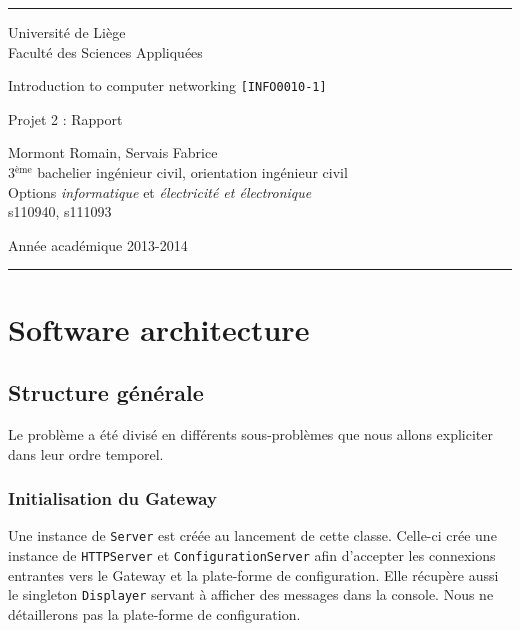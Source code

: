 \documentclass[a4paper,11pt]{article}
\begin{document}
\rule{1\linewidth}{1px}
{ \sc
\begin{center}
{\small Université de Liège}\\
{\small Faculté des Sciences Appliquées}

\end{center}

\vfill
\begin{center}

{\Huge Introduction to computer networking {\LARGE \tt [INFO0010-1]}\\}
\end{center}
\begin{center}
{\Huge Projet 2 : Rapport}
\end{center}
\begin{center}
Mormont Romain, Servais Fabrice\\
{\small 3$^{\text{ème}}$  bachelier ingénieur civil, orientation ingénieur civil}\\
{\small Options \textit{informatique} et \textit{électricité et électronique}}\\
{\small s110940, s111093}
\end{center}

\vfill
\begin{center}
Année académique 2013-2014\\
\end{center}
}
\rule{1\linewidth}{1px}
\newpage
\tableofcontents
\newpage
\section{Software architecture}
\subsection{Structure générale}
Le problème a été divisé en différents sous-problèmes que nous allons expliciter dans leur ordre temporel.

	\subsubsection{Initialisation du Gateway}
Une instance de \texttt{Server} est créée au lancement de cette classe. Celle-ci crée une instance de \texttt{HTTPServer} et \texttt{ConfigurationServer} afin d'accepter les connexions entrantes vers le Gateway et la plate-forme de configuration. Elle récupère aussi le singleton \texttt{Displayer} servant à afficher des messages dans la console. Nous ne détaillerons pas la plate-forme de configuration.
\end{document}
